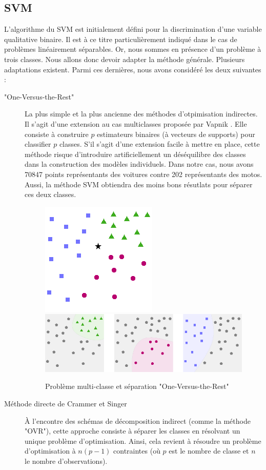 \documentclass[a4paper]{report}
\begin{document}
\subsection{SVM}

L'algorithme du SVM est initialement défini pour la discrimination d'une variable qualitative binaire. Il est à ce titre particulièrement indiqué dans le cas de problèmes linéairement séparables. Or, nous sommes en présence d'un problème à trois classes. Nous allons donc devoir adapter la méthode générale. Plusieurs adaptations existent. Parmi ces dernières, nous avons considéré les deux suivantes :

\begin{description}

\item["One-Versus-the-Rest"] La plus simple et la plus ancienne des méthodes d'otpimisation indirectes. Il s'agit d'une extension au cas multiclasses proposée par Vapnik \cite{Vapnik}. Elle consiste à construire $p$ estimateurs binaires (à vecteurs de supports) pour classifier $p$ classes. S'il s'agit d'une extension facile à mettre en place, cette méthode risque d'introduire artificiellement un déséquilibre des classes dans la construction des modèles individuels. Dans notre cas, nous avons 70847 points représentants des voitures contre 202 représentants des motos. Aussi, la méthode SVM obtiendra des moins bons résutlats pour séparer ces deux classes.

\begin{figure}
\centering
\includegraphics[scale=0.6]{img/svm.png}
\includegraphics[scale=0.6]{img/svm_OneVsAll.png}
\caption{Problème multi-classe et séparation "One-Versus-the-Rest"}
\end{figure}

\item[Méthode directe de Crammer et Singer \cite{Crammer}] À l'encontre des schémas de décomposition indirect (comme la méthode "OVR"), cette approche cons\-iste à séparer les classes en résolvant un unique problème d'optimisation. Ainsi, cela revient à résoudre un problème d'optimisation à $n(p-1)$ contraintes (où $p$ est le nombre de classe et $n$ le nombre d'observations).

\end{description}
\end{document}
